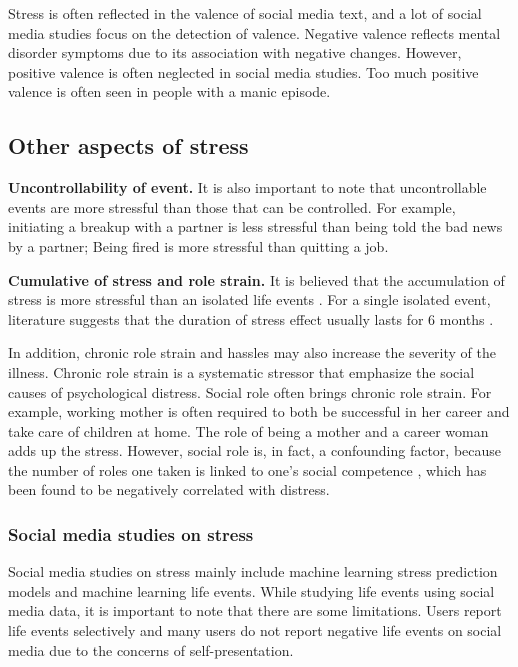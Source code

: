 Stress is often reflected in the valence of social media text, and a lot of social media studies focus on the detection of valence. Negative valence reflects mental disorder symptoms due to its association with negative changes. However, positive valence is often neglected in social media studies. Too much positive valence is often seen in people with a manic episode. 

\subsection{Other aspects of stress} 
\textbf{Uncontrollability of event.} It is also important to note that uncontrollable events are more stressful than those that can be controlled. For example, initiating a breakup with a partner is less stressful than being told the bad news by a partner; Being fired is more stressful than quitting a job. 

\textbf{Cumulative of stress and role strain.} It is believed that the accumulation of stress is more stressful than an isolated life events \cite{evans2013childhood}. For a single isolated event, literature suggests that the duration of stress effect usually lasts for 6 months  \cite{depue1986conceptualization,norris1987transitory}. 

In addition, chronic role strain and hassles may also increase the severity of the illness. Chronic role strain is a systematic stressor that emphasize the social causes of psychological distress. Social role often brings chronic role strain. For example, working mother is often required to both be successful in her career and take care of children at home. The role of being a mother and a career woman adds up the stress. However, social role is, in fact, a confounding factor, because the number of roles one taken is linked to one's social competence \cite{cohen1997measuring}, which has been found to be negatively correlated with distress.

\subsubsection{Social media studies on stress}
Social media studies on stress mainly include machine learning stress prediction models and machine learning life events. While studying life events using social media data, it is important to note that there are some limitations. Users report life events selectively and many users do not report negative life events on social media due to the concerns of self-presentation.

